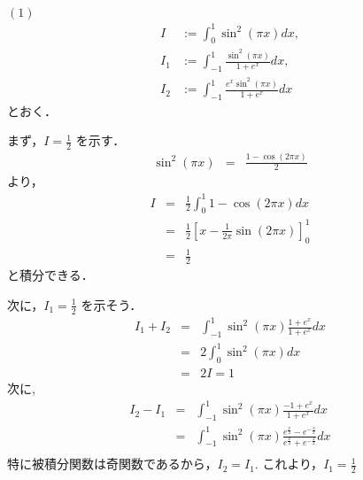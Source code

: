 \documentclass[main]{subfiles}
\begin{document}
\begin{pf}
$(1) $
\begin{eqnarray*}
I &:= \int^1_0\sin^2(\pi x) dx, \\
I_1 &:= \int^1_{-1}\frac{\sin^2(\pi x)}{1+e^x}dx, \\
I_2 &:= \int^1_{-1}\frac{e^x\sin^2(\pi x)}{1+e^x}dx
\end{eqnarray*}
とおく．

まず，$I = \frac{1}{2}$ を示す．
\begin{eqnarray*}
\sin^2(\pi x) &=& \frac{1-\cos(2\pi x)}{2}
\end{eqnarray*}
より，
\begin{eqnarray*}
I &=& \frac{1}{2}\int^1_0 1-\cos(2\pi x)dx \\
	&=& \frac{1}{2}[x-\frac{1}{2\pi}\sin(2\pi x)]^1_0 \\
	&=& \frac{1}{2}
\end{eqnarray*}
と積分できる．

次に，$I_1 = \frac{1}{2}$ を示そう．
\begin{eqnarray*}
I_1 + I_2 &=& \int^1_{-1}\sin^2(\pi x) \frac{1+e^x}{1+e^x}dx \\
			&=& 2\int^1_0\sin^2(\pi x)dx \\
			&=& 2I = 1
\end{eqnarray*}
次に, 
\begin{eqnarray*}
I_2 -I_1 &=& \int^1_{-1}\sin^2(\pi x) \frac{-1+e^x}{1+e^x}dx \\
&=& \int^1_{-1}\sin^2(\pi x) 
					\frac{e^\frac{x}{2}-e^{-\frac{x}{2}}}{e^\frac{x}{2}+e^{-\frac{x}{2}}}dx \\
\end{eqnarray*}
特に被積分関数は奇関数であるから，$I_2 = I_1$. これより，$I_1 =\frac{1}{2}$


\end{pf}
\end{document}
